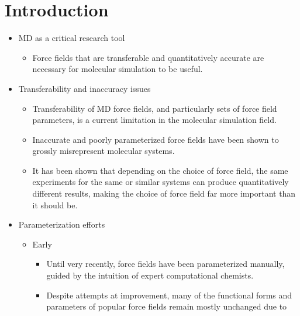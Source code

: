 \documentclass[aps,pre,nofootinbib,superscriptaddress,linenumbers,10pt, draft,tightenlines]{revtex4-1}
\begin{document}
\section{Introduction}
\begin{itemize}
	\item MD as a critical research tool
	\begin{itemize}
		\item Force fields that are transferable and quantitatively accurate are necessary 
              for molecular simulation to be useful. \cite{villin,villin2,drug_discov}
	\end{itemize}
    \item Transferability and inaccuracy issues
    \begin{itemize}
    	\item Transferability of MD force fields, and particularly sets of force field
              parameters, is a current limitation 
    	      in the molecular simulation field.\cite{transferability1,transferability2,
    	      transferability3,transferability4}  
        \item Inaccurate and poorly parameterized force fields have been shown to grossly
              misrepresent molecular systems.
              \cite{ffcomp1,ffcomp2,robustness} 
        \item It has been shown that depending on the choice of force field, the same 
              experiments for the same or similar systems can produce quantitatively
              different results, making the choice of force field far more important than it 
              should be. \cite{ffcomp1,ffcomp2,ewen_comparison_2016,petrov_are_2014,
              guvench_comparison_2008}\\
    \end{itemize}
	\item Parameterization efforts
	\begin{itemize}
		\item Early 
		\begin{itemize}
			\item Until very recently, force fields have been parameterized manually, 
                  guided by the intuition of expert computational chemists.\cite{parm94,
                  burger,law,combined,rational,aipar,charmm1,charmm2,mm1,mm2,mmff}
			\item Despite attempts at improvement, many of the functional forms and 
                  parameters of popular force fields remain mostly unchanged due to 

\end{itemize}
\end{itemize}
\end{itemize}
\end{document}
